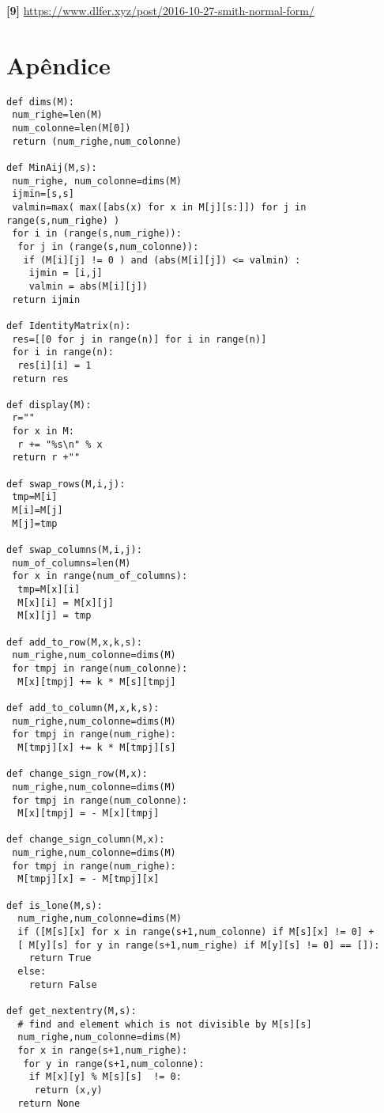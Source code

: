 \documentclass[12pt,a4paper]{article}
\theoremstyle{definition}
\begin{document}
\textbf{[9]}  \url{https://www.dlfer.xyz/post/2016-10-27-smith-normal-form/} \\ 


\section{Apêndice}

\begin{lstlisting}[language=iPython]
def dims(M):
 num_righe=len(M)
 num_colonne=len(M[0])
 return (num_righe,num_colonne)

def MinAij(M,s):
 num_righe, num_colonne=dims(M)
 ijmin=[s,s]
 valmin=max( max([abs(x) for x in M[j][s:]]) for j in range(s,num_righe) )
 for i in (range(s,num_righe)):
  for j in (range(s,num_colonne)):
   if (M[i][j] != 0 ) and (abs(M[i][j]) <= valmin) :
    ijmin = [i,j]
    valmin = abs(M[i][j])
 return ijmin

def IdentityMatrix(n):
 res=[[0 for j in range(n)] for i in range(n)]
 for i in range(n):
  res[i][i] = 1
 return res

def display(M):
 r=""
 for x in M:
  r += "%s\n" % x
 return r +""

def swap_rows(M,i,j):
 tmp=M[i]
 M[i]=M[j]
 M[j]=tmp

def swap_columns(M,i,j):
 num_of_columns=len(M)
 for x in range(num_of_columns):
  tmp=M[x][i]
  M[x][i] = M[x][j]
  M[x][j] = tmp

def add_to_row(M,x,k,s):
 num_righe,num_colonne=dims(M)
 for tmpj in range(num_colonne):
  M[x][tmpj] += k * M[s][tmpj]

def add_to_column(M,x,k,s):
 num_righe,num_colonne=dims(M)
 for tmpj in range(num_righe):
  M[tmpj][x] += k * M[tmpj][s]

def change_sign_row(M,x):
 num_righe,num_colonne=dims(M)
 for tmpj in range(num_colonne):
  M[x][tmpj] = - M[x][tmpj]

def change_sign_column(M,x):
 num_righe,num_colonne=dims(M)
 for tmpj in range(num_righe):
  M[tmpj][x] = - M[tmpj][x]

def is_lone(M,s):
  num_righe,num_colonne=dims(M)
  if ([M[s][x] for x in range(s+1,num_colonne) if M[s][x] != 0] + 
  [ M[y][s] for y in range(s+1,num_righe) if M[y][s] != 0] == []): 
    return True
  else:
    return False

def get_nextentry(M,s):
  # find and element which is not divisible by M[s][s]
  num_righe,num_colonne=dims(M)
  for x in range(s+1,num_righe):
   for y in range(s+1,num_colonne):
    if M[x][y] % M[s][s]  != 0:
     return (x,y)
  return None



\end{lstlisting}
\end{document}
